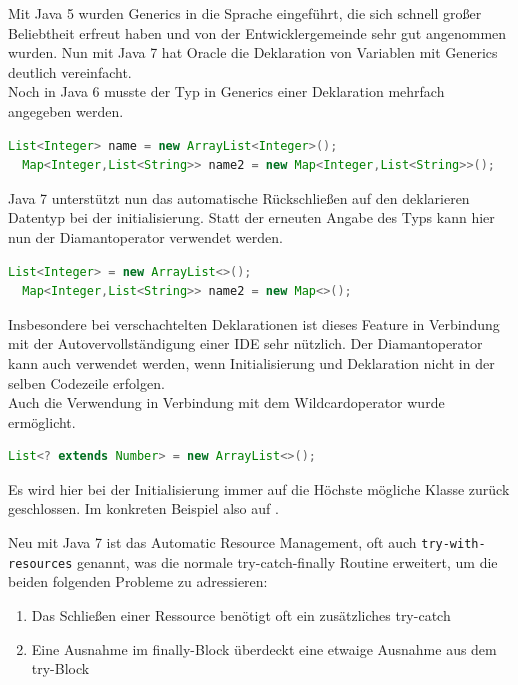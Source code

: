 \documentclass[times, 10pt,twocolumn]{article}
\begin{document}
Mit Java 5 wurden Generics in die Sprache eingeführt, die sich schnell großer Beliebtheit erfreut haben und von der Entwicklergemeinde sehr gut angenommen wurden. Nun mit Java 7 hat Oracle die Deklaration von Variablen mit Generics deutlich vereinfacht\cite{oracleJavaRel}.\\

Noch in Java 6 musste der Typ in Generics einer Deklaration mehrfach angegeben werden.
\begin{lstlisting}[language=java,breaklines=true]
  List<Integer> name = new ArrayList<Integer>();
  Map<Integer,List<String>> name2 = new Map<Integer,List<String>>();
\end{lstlisting}
Java 7 unterstützt nun das automatische Rückschließen auf den deklarieren Datentyp bei der initialisierung.\cite{v2bJava7} Statt der erneuten Angabe des Typs kann hier nun der Diamantoperator verwendet werden.
\begin{lstlisting}[language=java,breaklines=true]
  List<Integer> = new ArrayList<>();
  Map<Integer,List<String>> name2 = new Map<>();
\end{lstlisting}
Insbesondere bei verschachtelten Deklarationen ist dieses Feature in Verbindung mit der Autovervollständigung einer IDE sehr nützlich. Der Diamantoperator kann auch verwendet werden, wenn Initialisierung und Deklaration nicht in der selben Codezeile erfolgen.\cite{v2bJava7}\\

Auch die Verwendung in Verbindung mit dem Wildcardoperator wurde ermöglicht.
\begin{lstlisting}[language=java,breaklines=true]
  List<? extends Number> = new ArrayList<>();
\end{lstlisting}
Es wird hier bei der Initialisierung immer auf die Höchste mögliche Klasse zurück geschlossen. Im konkreten Beispiel also auf .\cite{v2bJava7}

\label{try_sec}
Neu mit Java 7 ist das Automatic Resource Management, oft auch \texttt{try-with-resources} genannt, was die normale try-catch-finally 
Routine erweitert, um die beiden folgenden Probleme zu adressieren:\cite{javainsel2}
\begin{enumerate}
\item Das Schließen einer Ressource benötigt oft ein zusätzliches try-catch
\item Eine Ausnahme im finally-Block überdeckt eine etwaige Ausnahme aus dem try-Block
\end{enumerate}
\end{document}
